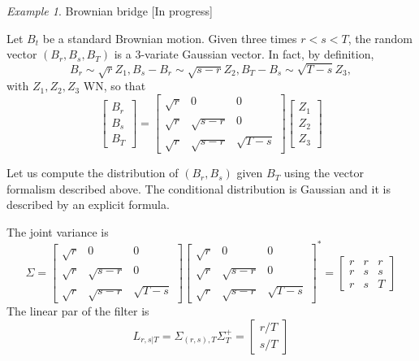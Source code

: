 \documentclass[12pt,a4paper]{amsart}
\theoremstyle{plain}%
\theoremstyle{definition}
\theoremstyle{remark}
\newtheorem{example}{Example}
\begin{document}
\begin{example}{Brownian bridge} [In progress]

Let $B_t$ be a standard Brownian motion. Given three times $r < s < T$, the random vector $(B_r,B_s,B_T)$ is a 3-variate Gaussian vector. In fact, by definition,
\begin{equation*}
    B_r \sim \sqrt r Z_1, B_s-B_r \sim \sqrt{s-r} Z_2, B_T-B_s \sim \sqrt{T-s} Z_3,
\end{equation*}
with $Z_1,Z_2,Z_3$ WN, so that
\begin{equation*}
    \begin{bmatrix}
      B_r \\ B _s \\ B_T
    \end{bmatrix} = \begin{bmatrix}
    \sqrt r & 0 & 0 \\
    \sqrt r & \sqrt{s-r} & 0 \\
     \sqrt r & \sqrt{s-r} & \sqrt{T-s}
    \end{bmatrix}
    \begin{bmatrix}
      Z_1 \\ Z_2 \\ Z_3
    \end{bmatrix}
\end{equation*}

Let us compute the distribution of $(B_r,B_s)$ given $B_T$ using the vector formalism described above. The conditional distribution is Gaussian and it is described by an explicit formula.

The joint variance is
\begin{equation*}
   \Sigma = \begin{bmatrix}
    \sqrt r & 0 & 0 \\
    \sqrt r & \sqrt{s-r} & 0 \\
     \sqrt r & \sqrt{s-r} & \sqrt{T-s}
    \end{bmatrix} \begin{bmatrix}
    \sqrt r & 0 & 0 \\
    \sqrt r & \sqrt{s-r} & 0 \\
     \sqrt r & \sqrt{s-r} & \sqrt{T-s}
    \end{bmatrix}^*        = \begin{bmatrix}
      r & r & r \\
      r & s & s \\
      r & s & T 
    \end{bmatrix}
\end{equation*}
The linear par of the filter is
\begin{equation*}
    L_{r,s|T} = \Sigma_{(r,s),T} \Sigma^+_T = \begin{bmatrix}
      r/T \\ s/T
    \end{bmatrix}
\end{equation*}


\end{example}
\end{document}

